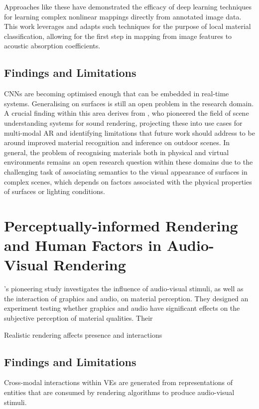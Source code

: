 Approaches like these have demonstrated the efficacy of deep learning techniques for learning complex nonlinear mappings directly from annotated image data. This work leverages and adapts such techniques for the purpose of local material classification, allowing for the first step in mapping from image features to acoustic absorption coefficients.

\subsection{Findings and Limitations}
CNNs are becoming optimised enough that can be embedded in real-time systems. Generalising on surfaces is still an open problem in the research domain.
A crucial finding within this area derives from \cite{schissler2017acoustic}, who pioneered the field of scene understanding systems for sound rendering, projecting these into use cases for multi-modal AR and identifying limitations that future work should address to be around improved material recognition and inference on outdoor scenes. In general, the problem of recognising materials both in physical and virtual environments remains an open research question within these domains due to the challenging task of associating semantics to the visual appearance of surfaces in complex scenes, which depends on factors associated with the physical properties of surfaces or lighting conditions.  

\section{Perceptually-informed Rendering and Human Factors in Audio-Visual Rendering}
\cite{bonneel2010bimodal}'s pioneering study investigates the influence of audio-visual stimuli, as well as the interaction of graphics and audio, on material perception. They designed an experiment testing whether graphics and audio have significant effects on the subjective perception of material qualities. Their 

\cite{slater2009visual} Realistic rendering affects presence and interactions

\subsection{Findings and Limitations}
Cross-modal interactions within VEs are generated from representations of entities that are consumed by rendering algorithms to produce audio-visual stimuli. 


